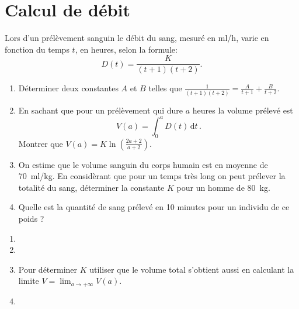 \documentclass[11pt,class=report,crop=false]{standalone}
\begin{document}

\section*{Calcul de débit}



\exercice{}
\enonce
    Lors d'un prélèvement sanguin le débit du sang, mesuré en {ml/h}, varie en fonction du temps $t$, en heures, selon la formule:
    $$
        D(t) = \frac{K}{(t+1)(t+2)}.
    $$
    \begin{enumerate}
        \item Déterminer deux constantes $A$ et $B$ telles que $\frac{1}{(t+1)(t+2)}=\frac{A}{t+1} + \frac{B}{t+2}$.
        \item En sachant que pour un prélèvement qui dure $a$ heures la volume prélevé  est
            $$
                V(a)=\int_0^a D(t)\,\mathrm{d}t\,.
            $$
        Montrer que $V(a) = K\ln\left(\frac{2a+2}{a+2}\right)$.
        \item On estime que le volume sanguin du corps humain est en moyenne de 70~{ml/kg}. En considèrant que pour un temps très long on peut prélever la totalité du sang, déterminer la constante $K$ pour un homme de 80~{kg}.
        \item Quelle est la quantité de sang prélevé en 10 minutes pour un individu de ce poids ?
    \end{enumerate}
\finenonce

\indication
\sauteligne
    \begin{enumerate}
    	\item 
    	\item 
    	\item Pour déterminer $K$ utiliser que le volume total s'obtient aussi en calculant la limite $V = \lim_{a \to +\infty} V(a)$.
    	\item 
    \end{enumerate}
\finindication

\correction

\end{document}
